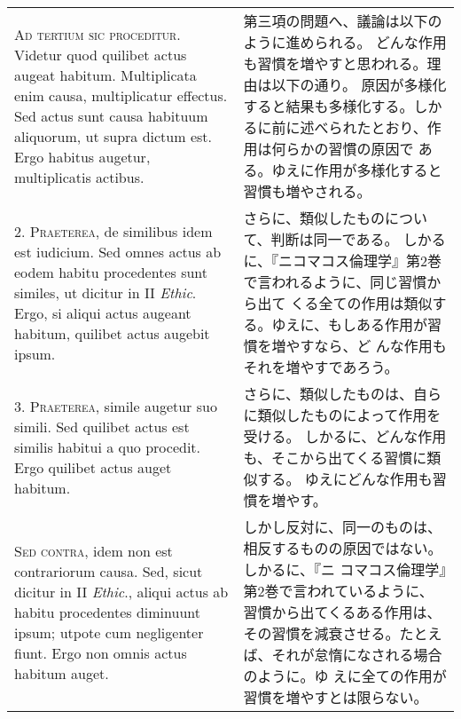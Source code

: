 \documentclass[10pt]{jsarticle} %
\begin{document}
\begin{longtable}{p{21em}p{21em}}

{\scshape Ad tertium sic proceditur}. Videtur quod quilibet actus augeat
habitum. Multiplicata enim causa, multiplicatur effectus. Sed actus
sunt causa habituum aliquorum, ut supra dictum est. Ergo habitus
augetur, multiplicatis actibus.

&

第三項の問題へ、議論は以下のように進められる。
どんな作用も習慣を増やすと思われる。理由は以下の通り。
原因が多様化すると結果も多様化する。しかるに前に述べられたとおり、作用は何らかの習慣の原因で
 ある。ゆえに作用が多様化すると習慣も増やされる。

\\



2. {\scshape Praeterea}, de similibus idem est iudicium. Sed omnes actus ab eodem
habitu procedentes sunt similes, ut dicitur in II {\itshape Ethic}. Ergo, si
aliqui actus augeant habitum, quilibet actus augebit ipsum.

&

さらに、類似したものについて、判断は同一である。
しかるに、『ニコマコス倫理学』第2巻で言われるように、同じ習慣から出て
 くる全ての作用は類似する。ゆえに、もしある作用が習慣を増やすなら、ど
 んな作用もそれを増やすであろう。

\\



3. {\scshape Praeterea}, simile augetur suo simili. Sed quilibet actus est similis
habitui a quo procedit. Ergo quilibet actus auget habitum.

&

さらに、類似したものは、自らに類似したものによって作用を受ける。
しかるに、どんな作用も、そこから出てくる習慣に類似する。
ゆえにどんな作用も習慣を増やす。

\\



{\scshape Sed contra}, idem non est contrariorum causa. Sed, sicut dicitur in II
{\itshape Ethic}., aliqui actus ab habitu procedentes diminuunt ipsum; utpote cum
negligenter fiunt. Ergo non omnis actus habitum auget.

&

しかし反対に、同一のものは、相反するものの原因ではない。しかるに、『ニ
 コマコス倫理学』第2巻で言われているように、習慣から出てくるある作用は、
 その習慣を減衰させる。たとえば、それが怠惰になされる場合のように。ゆ
 えに全ての作用が習慣を増やすとは限らない。


\end{longtable}
\end{document}
